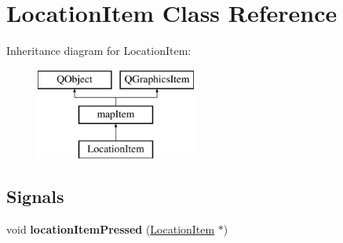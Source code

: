 \hypertarget{class_location_item}{\section{Location\-Item Class Reference}
\label{class_location_item}
}
Inheritance diagram for Location\-Item\-:\begin{figure}[H]
\begin{center}
\leavevmode
\includegraphics[height=3.000000cm]{class_location_item}
\end{center}
\end{figure}
\subsection*{Signals}
\begin{DoxyCompactItemize}
\item 
\hypertarget{class_location_item_a7278dba6a4c23f6a4caab6ec92207864}{void {\bfseries location\-Item\-Pressed} (\hyperlink{class_location_item}{Location\-Item} $\ast$)}\label{class_location_item_a7278dba6a4c23f6a4caab6ec92207864}

\end{DoxyCompactItemize}

